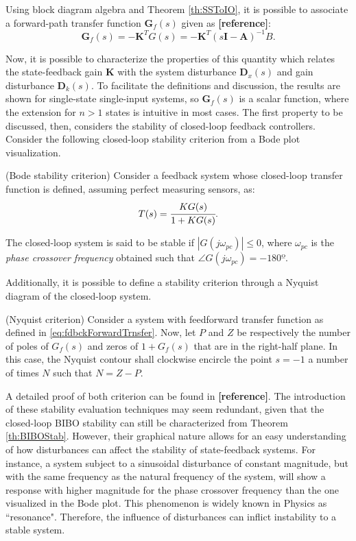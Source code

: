 \documentclass[a4paper,11pt]{book}
\numberwithin{figure}{chapter}
\numberwithin{equation}{chapter}
\numberwithin{table}{chapter}
\newtheorem{theorem}{Theorem}[chapter]
\theoremstyle{definition}
\newcounter{boxed-theorem}
\newenvironment{boxed-theorem}[1]
{\colorlet{shadecolor}{pastelBlue2!10} \begin{shaded} \begin{theorem}{#1}}
{\end{theorem} \end{shaded}}
\newcounter{boxed-definition}
\newcounter{boxed-example}
\begin{document}
Using block diagram algebra and Theorem \ref{th:SSToIO}, it is possible to associate a forward-path transfer function $\bm{G}_{f}(s)$ given as \textbf{[reference]}:
\begin{equation} \label{eq:fdbckForwardTrnsfer}
    \bm{G}_{f}(s) = -\bm{K}^T G(s) =  -\bm{K}^{T} \left(s \bm{I} - \bm{A} \right)^{-1} B 
.\end{equation}

Now, it is possible to characterize the properties of this quantity which relates the state-feedback gain $\bm{K}$ with the system disturbance $\bm{D}_x(s)$ and gain disturbance $\bm{D}_k(s)$. To facilitate the definitions and discussion, the results are shown for single-state single-input systems, so $\bm{G}_f(s)$ is a scalar function, where the extension for $n > 1$ states is intuitive in most cases. The first property to be discussed, then, considers the stability of closed-loop feedback controllers. Consider the following closed-loop stability criterion from a Bode plot visualization.

\begin{boxed-theorem}{(Bode stability criterion)}
    Consider a feedback system whose closed-loop transfer function is defined, assuming perfect measuring sensors, as:
    \begin{equation}
        T(s) = \cfrac{K G(s)}{1 + K G(s)}
    .\end{equation}
    
    The closed-loop system is said to be stable if $| G(j \omega_{pc}) | \leq 0 $, where $\omega_{pc}$ is the \textit{phase crossover frequency} obtained such that $\angle G(j \omega_{pc}) = -180º$.
\end{boxed-theorem}

Additionally, it is possible to define a stability criterion through a Nyquist diagram of the closed-loop system.

\begin{boxed-theorem}{(Nyquist criterion)}
    Consider a system with feedforward transfer function as defined in \eqref{eq:fdbckForwardTrnsfer}. Now, let $P$ and $Z$ be respectively the number of poles of $G_{f}(s)$ and zeros of $1 + G_{f}(s)$ that are in the right-half plane. In this case, the Nyquist contour shall clockwise encircle the point $s = -1$ a number of times $N$ such that $N = Z - P$.
\end{boxed-theorem}

A detailed proof of both criterion can be found in \textbf{[reference]}. The introduction of these stability evaluation techniques may seem redundant, given that the closed-loop BIBO stability can still be characterized from Theorem \ref{th:BIBOStab}. However, their graphical nature allows for an easy understanding of how disturbances can affect the stability of state-feedback systems. For instance, a system subject to a sinusoidal disturbance of constant magnitude, but with the same frequency as the natural frequency of the system, will show a response with higher magnitude for the phase crossover frequency than the one visualized in the Bode plot. This phenomenon is widely known in Physics as ``resonance". Therefore, the influence of disturbances can inflict instability to a stable system.
\end{document}
